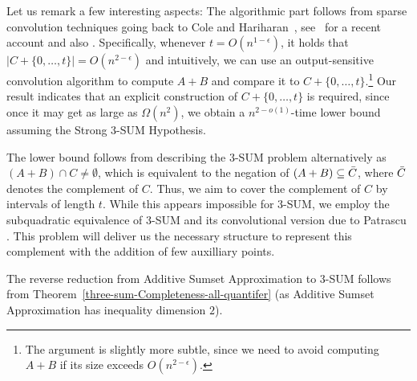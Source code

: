 Let us remark a few interesting aspects: The algorithmic part follows from sparse convolution techniques
going back to Cole and Hariharan~\cite{DBLP:conf/stoc/ColeH02}, see~\cite{DBLP:journals/corr/abs-2107-07625} for a recent account and also \cite{DBLP:conf/stoc/ChanL15,DBLP:conf/icalp/BringmannN21,DBLP:conf/stoc/BringmannFN21}. Specifically, whenever $t = O(n^{1-\epsilon})$, it holds that $|C + \{0, \dots, t\}| = O(n^{2-\epsilon})$ and intuitively,
we can use an output-sensitive convolution algorithm to compute $A+B$ and compare it to $C+\{0, \dots, t\}$.\footnote{The argument is slightly more subtle, since we need to avoid computing $A+B$ if its size exceeds $O(n^{2-\epsilon})$.}
Our result indicates that an explicit construction of $C+\{0, \dots, t\}$ is required, since once it may get as large as $\Omega(n^2)$, we obtain a $n^{2-o(1)}$-time lower
bound assuming the Strong $3$-SUM Hypothesis.  

The lower bound follows from describing the $3$-SUM problem alternatively as $(A+B) \cap C \neq \emptyset$, which is equivalent to the negation of $(A+B)\subseteq \Bar{C}$, where $\Bar{C}$ denotes the complement of $C$.
Thus, we aim to cover the complement of $C$ by intervals of length $t$. While this appears impossible for $3$-SUM, we employ the subquadratic equivalence of $3$-SUM and its convolutional version due to Patrascu \cite{DBLP:conf/stoc/Patrascu10}. This problem will deliver us the necessary structure to represent this complement with the addition of few auxilliary points.


The reverse reduction from Additive Sumset Approximation to $3$-SUM follows from Theorem~\ref{three-sum-Completeness-all-quantifer} (as Additive Sumset Approximation has inequality dimension $2$).

